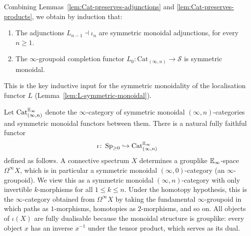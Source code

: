 \documentclass{amsart}
\begin{document}
\begin{remark}
\label{rmk:inductive-sym-mon}
Combining Lemmas~\ref{lem:Cat-preserves-adjunctions} and \ref{lem:Cat-preserves-products}, we obtain by induction that:
\begin{enumerate}
\item[$\natural_1$] The adjunctions $L_{n-1} \dashv \iota_n$ are symmetric monoidal adjunctions, for every $n \geq 1$.
\item[$\natural_2$] The $\infty$-groupoid completion functor $L_0 \colon \mathrm{Cat}_{(\infty,n)} \to \mathcal{S}$ is symmetric monoidal.
\end{enumerate}
This is the key inductive input for the symmetric monoidality of the localisation functor $L$ (Lemma~\ref{lem:L-symmetric-monoidal}).
\end{remark}










Let $\operatorname{Cat}_{(\infty,n)}^{\mathbb{E}_\infty}$ denote the $\infty$-category of symmetric monoidal $(\infty,n)$-categories and symmetric monoidal functors between them. There is a natural fully faithful functor
\[
\iota\colon \operatorname{Sp}_{\ge 0} \hookrightarrow \operatorname{Cat}_{(\infty,n)}^{\mathbb{E}_\infty}
\]
defined as follows. A connective spectrum $X$ determines a grouplike $\mathbb{E}_\infty$-space $\Omega^\infty X$, which is in particular a symmetric monoidal $(\infty,0)$-category (an $\infty$-groupoid). We view this as a symmetric monoidal $(\infty,n)$-category with only invertible $k$-morphisms for all $1 \le k \le n$. Under the homotopy hypothesis, this is the $\infty$-category obtained from $\Omega^\infty X$ by taking the fundamental $\infty$-groupoid in which paths as $1$-morphisms, homotopies as $2$-morphisms, and so on. All objects of $\iota(X)$ are fully dualisable because the monoidal structure is grouplike: every object $x$ has an inverse $x^{-1}$ under the tensor product, which serves as its dual. 
\end{document}
